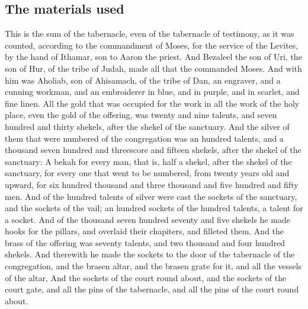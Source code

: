 \begin{biblechapter}
\section*{The materials used}
\verse This is the sum of the tabernacle, even of the tabernacle of testimony, as it was counted, according to the commandment of Moses, for the service of the Levites, by the hand of Ithamar, son to Aaron the priest.
\verse And Bezaleel the son of Uri, the son of Hur, of the tribe of Judah, made all that the \LORD commanded Moses.
\verse And with him was Aholiab, son of Ahisamach, of the tribe of Dan, an engraver, and a cunning workman, and an embroiderer in blue, and in purple, and in scarlet, and fine linen.
\verse All the gold that was occupied for the work in all the work of the holy place, even the gold of the offering, was twenty and nine talents, and seven hundred and thirty shekels, after the shekel of the sanctuary.
\verse And the silver of them that were numbered of the congregation was an hundred talents, and a thousand seven hundred and threescore and fifteen shekels, after the shekel of the sanctuary:
\verse A bekah for every man, that is, half a shekel, after the shekel of the sanctuary, for every one that went to be numbered, from twenty years old and upward, for six hundred thousand and three thousand and five hundred and fifty men.
\verse And of the hundred talents of silver were cast the sockets of the sanctuary, and the sockets of the vail; an hundred sockets of the hundred talents, a talent for a socket.
\verse And of the thousand seven hundred seventy and five shekels he made hooks for the pillars, and overlaid their chapiters, and filleted them.
\verse And the brass of the offering was seventy talents, and two thousand and four hundred shekels.
\verse And therewith he made the sockets to the door of the tabernacle of the congregation, and the brasen altar, and the brasen grate for it, and all the vessels of the altar,
\verse And the sockets of the court round about, and the sockets of the court gate, and all the pins of the tabernacle, and all the pins of the court round about.
\end{biblechapter}

